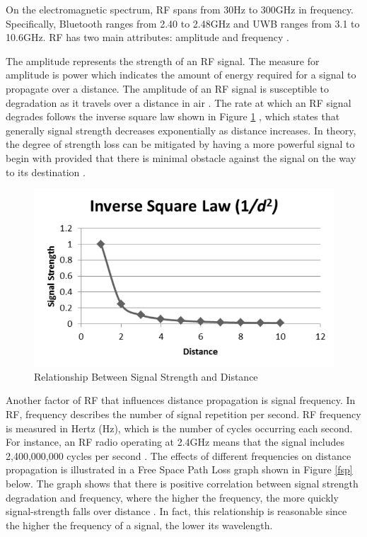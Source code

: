 \medskip
On the electromagnetic spectrum, RF spans from 30Hz to 300GHz in frequency. Specifically, Bluetooth ranges from 2.40 to 2.48GHz and UWB ranges from 3.1 to 10.6GHz. RF has two main attributes: amplitude and frequency \cite{R2-4-1}.

\medskip
The amplitude represents the strength of an RF signal. The measure for amplitude is power which indicates the amount of energy required for a signal to propagate over a distance. The amplitude of an RF signal is susceptible to degradation as it travels over a distance in air \cite{R2-4-1}. The rate at which an RF signal degrades follows the inverse square law shown in Figure \ref{isl} , which states that generally signal strength decreases exponentially as distance increases. In theory, the degree of strength loss can be mitigated by having a more powerful signal to begin with provided that there is minimal obstacle against the signal on the way to its destination \cite{R2-4-2}.

\medskip
\begin{figure}[H]
\centering
    \includegraphics[scale=0.75]{./images/ISL.png}
    \caption{Relationship Between Signal Strength and Distance}
    \label{isl}
\end{figure}


\medskip
Another factor of RF that influences distance propagation is signal frequency. In RF, frequency describes the number of signal repetition per second. RF frequency is measured in Hertz (Hz), which is the number of cycles occurring each second. For instance, an RF radio operating at 2.4GHz means that the signal includes 2,400,000,000 cycles per second \cite{R2-4-1}. The effects of different frequencies on distance propagation is illustrated in a Free Space Path Loss graph shown in Figure \ref{fsp} below. The graph shows that there is positive correlation between signal strength degradation and frequency, where the higher the frequency, the more quickly signal-strength falls over distance \cite{R2-4-2}. In fact, this relationship is reasonable since the higher the frequency of a signal, the lower its wavelength. 

